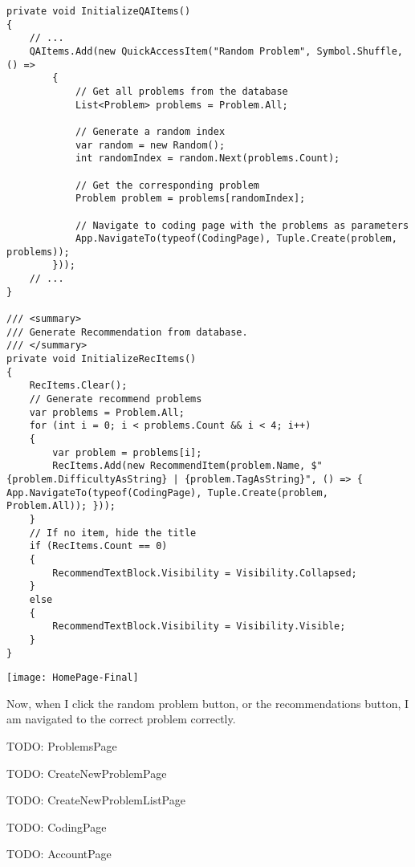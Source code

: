 \documentclass[report.tex]{subfiles}
\begin{document}
\begin{verbatim}
private void InitializeQAItems()
{
    // ...    
    QAItems.Add(new QuickAccessItem("Random Problem", Symbol.Shuffle, () =>
        {
            // Get all problems from the database
            List<Problem> problems = Problem.All;

            // Generate a random index
            var random = new Random();
            int randomIndex = random.Next(problems.Count);

            // Get the corresponding problem
            Problem problem = problems[randomIndex];

            // Navigate to coding page with the problems as parameters
            App.NavigateTo(typeof(CodingPage), Tuple.Create(problem, problems));
        }));
    // ...
}

/// <summary>
/// Generate Recommendation from database.
/// </summary>
private void InitializeRecItems()
{
    RecItems.Clear();
    // Generate recommend problems
    var problems = Problem.All;
    for (int i = 0; i < problems.Count && i < 4; i++)
    {
        var problem = problems[i];
        RecItems.Add(new RecommendItem(problem.Name, $"{problem.DifficultyAsString} | {problem.TagAsString}", () => { App.NavigateTo(typeof(CodingPage), Tuple.Create(problem, Problem.All)); }));
    }
    // If no item, hide the title
    if (RecItems.Count == 0)
    {
        RecommendTextBlock.Visibility = Visibility.Collapsed;
    }
    else
    {
        RecommendTextBlock.Visibility = Visibility.Visible;
    }
}
\end{verbatim}

\texttt{[image: HomePage-Final]}

Now, when I click the random problem button, or the recommendations button, I am navigated to the correct problem correctly.

TODO: ProblemsPage

TODO: CreateNewProblemPage

TODO: CreateNewProblemListPage

TODO: CodingPage

TODO: AccountPage
\end{document}

